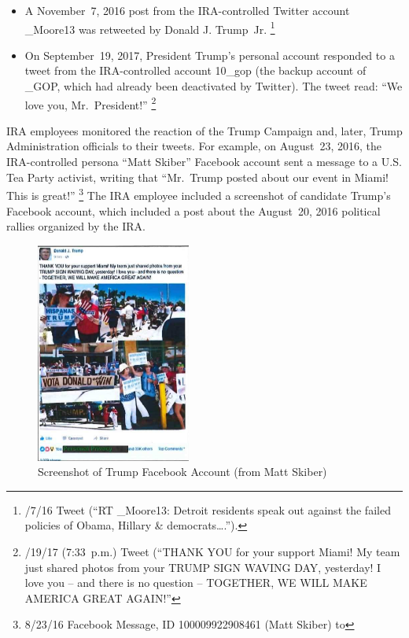 \begin{itemize}
    \item A November~7, 2016 post from the IRA-controlled Twitter account \@Pamela\_Moore13 was retweeted by Donald J. Trump~Jr.%
    \footnote{/7/16 Tweet (``RT \@Pamela\_Moore13: Detroit residents speak out against the failed policies of Obama, Hillary \& democrats\dots.'').}
    \item On September~19, 2017, President Trump's personal account \@realDonaldTrump responded to a tweet from the IRA-controlled account \@10\_gop (the backup account of \@TEN\_GOP, which had already been deactivated by Twitter). The tweet read: ``We love you, Mr.~President!''%
    \footnote{/19/17 (7:33~p.m.) Tweet (``THANK YOU for your support Miami! My team just shared photos from your TRUMP SIGN WAVING DAY, yesterday! I love you -- and there is no question -- TOGETHER, WE WILL MAKE AMERICA GREAT AGAIN!''}
\end{itemize}

IRA employees monitored the reaction of the Trump Campaign and, later, Trump Administration officials to their tweets.
For example, on August~23, 2016, the IRA-controlled persona ``Matt Skiber'' Facebook account sent a message to a U.S. Tea Party activist, writing that ``Mr.~Trump posted about our event in Miami! This is great!''%
\footnote{8/23/16 Facebook Message, ID 100009922908461 (Matt Skiber) to }
The IRA employee included a screenshot of candidate Trump's Facebook account, which included a post about the August~20, 2016 political rallies organized by the IRA\null.

\begin{figure}
    \vspace{-20pt}
    \begin{center}
        \includegraphics[width=2in]{images/p-34-trump-facebook.png}%
    \end{center}
    \vspace{-20pt}
    \caption*{Screenshot of Trump Facebook Account (from Matt Skiber)}
    \vspace{-10pt}
    \label{fig:trump-facebook}
\end{figure}

